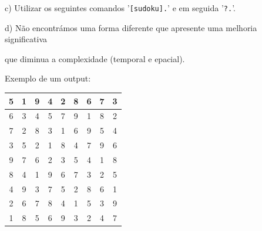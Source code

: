 \documentclass[11pt]{article}
\begin{document}
\hspace{0,6cm}c) Utilizar os seguintes comandos '\verb|[sudoku].|' e em seguida 
'\verb|?.|'.

\hspace{0,6cm}d) Não encontrámos uma forma diferente que apresente uma melhoria significativa

\hspace{1,1cm}que diminua a complexidade (temporal e epacial).
\newline

Exemplo de um output:
\begin{table}[h!]
    \begin{center}
        \begin{tabular}{|c|c|c|c|c|c|c|c|c|}
            \hline
            5 & 1 & 9 & 4 & 2 & 8 & 6 & 7 & 3 \\
            \hline
            6 & 3 & 4 & 5 & 7 & 9 & 1 & 8 & 2 \\
            \hline
            7 & 2 & 8 & 3 & 1 & 6 & 9 & 5 & 4 \\
            \hline
            3 & 5 & 2 & 1 & 8 & 4 & 7 & 9 & 6 \\
            \hline
            9 & 7 & 6 & 2 & 3 & 5 & 4 & 1 & 8 \\
            \hline
            8 & 4 & 1 & 9 & 6 & 7 & 3 & 2 & 5 \\
            \hline
            4 & 9 & 3 & 7 & 5 & 2 & 8 & 6 & 1 \\
            \hline
            2 & 6 & 7 & 8 & 4 & 1 & 5 & 3 & 9 \\
            \hline
            1 & 8 & 5 & 6 & 9 & 3 & 2 & 4 & 7 \\
            \hline
        \end{tabular}
    \end{center}
\end{table}
\end{document}
